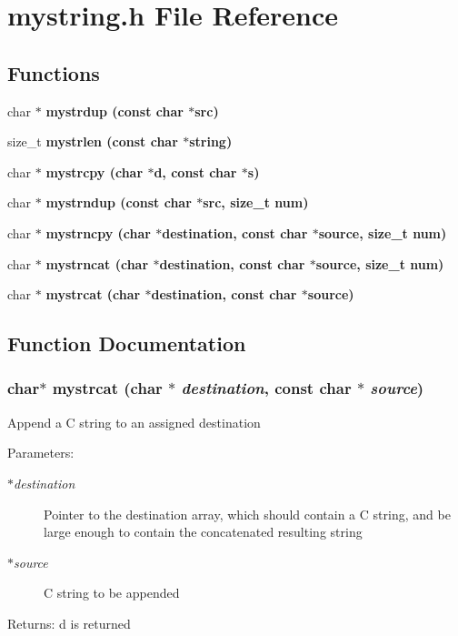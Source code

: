 \section{mystring.h File Reference}
\label{mystring_8h}
\subsection*{Functions}
\begin{CompactItemize}
\item 
char $\ast$ \bf{mystrdup} (const char $\ast$src)
\item 
size\_\-t \bf{mystrlen} (const char $\ast$string)
\item 
char $\ast$ \bf{mystrcpy} (char $\ast$d, const char $\ast$s)
\item 
char $\ast$ \bf{mystrndup} (const char $\ast$src, size\_\-t num)
\item 
char $\ast$ \bf{mystrncpy} (char $\ast$destination, const char $\ast$source, size\_\-t num)
\item 
char $\ast$ \bf{mystrncat} (char $\ast$destination, const char $\ast$source, size\_\-t num)
\item 
char $\ast$ \bf{mystrcat} (char $\ast$destination, const char $\ast$source)
\end{CompactItemize}


\subsection{Function Documentation}
\subsubsection{\setlength{\rightskip}{0pt plus 5cm}char$\ast$ mystrcat (char $\ast$ {\em destination}, const char $\ast$ {\em source})}\label{mystring_8h_7d6fc6523f6b6af2c4295c9c6b1bd78e}


Append a C string to an assigned destination \begin{Desc}
\item[Parameters:]
\begin{description}
\item[{\em $\ast$destination}]Pointer to the destination array, which should contain a C string, and be large enough to contain the concatenated resulting string \item[{\em $\ast$source}]C string to be appended \end{description}
\end{Desc}
\begin{Desc}
\item[Returns:]d is returned \end{Desc}
